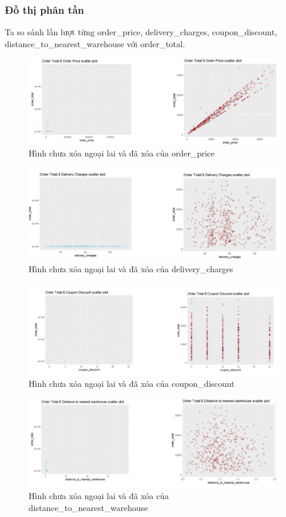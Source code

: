 \subsubsection{Đồ thị phân tần}
Ta so sánh  lần lượt từng order\_price, delivery\_charges, coupon\_discount, distance\_to\_nearest\_warehouse với order\_total.
\begin{figure}[H]
    \centering
    \includegraphics[width=0.8\linewidth]{graphics/bang9.jpg}
    \caption{Hình chưa xóa ngoại lai và đã xóa của order\_price}
 
\end{figure}
\begin{figure}[H]
    \centering
    \includegraphics[width=0.8\linewidth]{graphics/bang10.jpg}
    \caption{Hình chưa xóa ngoại lai và đã xóa của delivery\_charges}
    
\end{figure}
\begin{figure}[H]
    \centering
    \includegraphics[width=0.8\linewidth]{graphics/bang11.jpg}
    \caption{Hình chưa xóa ngoại lai và đã xóa của coupon\_discount}
    
\end{figure}
\begin{figure}[H]
    \centering
    \includegraphics[width=0.8\linewidth]{graphics/bang12.jpg}
    \caption{Hình chưa xóa ngoại lai và đã xóa của distance\_to\_nearest\_warehouse}
 
\end{figure}
